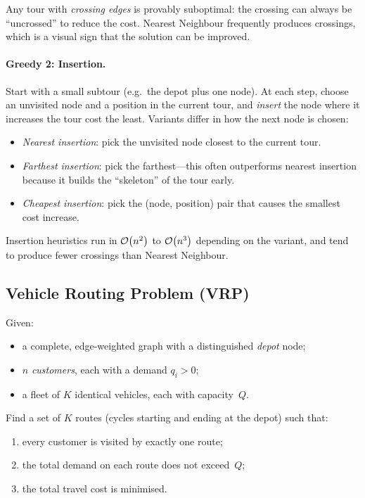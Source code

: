 \begin{remark}
Any tour with \emph{crossing edges} is provably suboptimal:
the crossing can always be ``uncrossed'' to reduce the cost.
Nearest Neighbour frequently produces crossings, which is a
visual sign that the solution can be improved.
\end{remark}

\paragraph{Greedy 2: Insertion.}
Start with a small subtour (e.g.\ the depot plus one node).
At each step, choose an unvisited node and a position in the
current tour, and \emph{insert} the node where it increases the
tour cost the least.
Variants differ in how the next node is chosen:
\begin{itemize}[nosep]
  \item \emph{Nearest insertion}: pick the unvisited node closest
        to the current tour.
  \item \emph{Farthest insertion}: pick the farthest---this
        often outperforms nearest insertion because it builds the
        ``skeleton'' of the tour early.
  \item \emph{Cheapest insertion}: pick the (node, position) pair
        that causes the smallest cost increase.
\end{itemize}
Insertion heuristics run in $\mathcal{O}\!\left(n^2\right)$ to $\mathcal{O}\!\left(n^3\right)$ depending on
the variant, and tend to produce fewer crossings than Nearest
Neighbour.


\subsection{Vehicle Routing Problem (VRP)}
\label{ssec:vrp}

\begin{definition}
\label{def:cvrp}
Given:
\begin{itemize}[nosep]
  \item a complete, edge-weighted graph with a distinguished
        \emph{depot} node;
  \item $n$ \emph{customers}, each with a demand $q_i > 0$;
  \item a fleet of $K$ identical vehicles, each with
        capacity~$Q$.
\end{itemize}
Find a set of $K$ routes (cycles starting and ending at the
depot) such that:
\begin{enumerate}[nosep]
  \item every customer is visited by exactly one route;
  \item the total demand on each route does not exceed~$Q$;
  \item the total travel cost is minimised.
\end{enumerate}
\end{definition}

